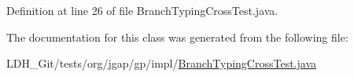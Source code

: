 Definition at line 26 of file Branch\-Typing\-Cross\-Test.\-java.



The documentation for this class was generated from the following file\-:\begin{DoxyCompactItemize}
\item 
L\-D\-H\-\_\-\-Git/tests/org/jgap/gp/impl/\hyperlink{_branch_typing_cross_test_8java}{Branch\-Typing\-Cross\-Test.\-java}\end{DoxyCompactItemize}
